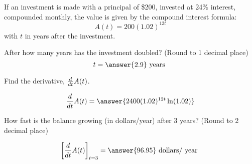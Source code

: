 \documentclass{ximera}
\author{Bobby Ramsey}
\begin{document}
\begin{exercise}

	If an investment is made with a principal of \$200, invested at 24\% interest, compounded monthly, the value is
	given by the compound interest formula:
	\[ A(t) = 200(1.02)^{12 t} \]
	with $t$ in years after the investment.
	
	After how many years has the investment doubled? (Round to 1 decimal place)
	\[ t = \answer{2.9} \text{ years } \]
	\begin{exercise}
		Find the derivative, $\frac{d}{\mathop{}\!d t}{A(t)}$.
		
		\[ \ddt{A(t)} = \answer{ 2400(1.02)^{12t} \ln(1.02)} \]
		
		\begin{exercise}
			How fast is the balance growing (in dollars/year) after 3 years? (Round to 2 decimal place)
		
			\[ \eval{\ddt{A(t)}}_{t=3} =  \answer{ 96.95 } \text{ dollars/ year }\]
		\end{exercise}
	\end{exercise}
	
\end{exercise}
\end{document}
